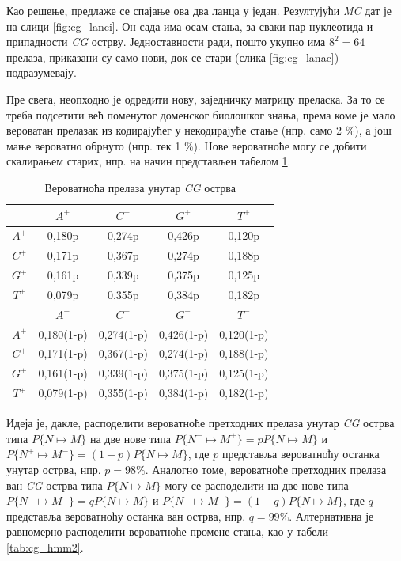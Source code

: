 \documentclass[12pt,oneside]{memoir}
\begin{document}
\begin{CJK}{UTF8}{ipxm}
Као решење, предлаже се спајање ова два ланца у један. Резултујући \textit{MC} дат је на слици \ref{fig:cg_lanci}. Он сада има осам стања, за сваки пар нуклеотида и припадности \textit{CG} острву. Једноставности ради, пошто укупно има $8^2 = 64$ прелаза, приказани су само нови, док се стари (слика \ref{fig:cg_lanac}) подразумевају.

Пре свега, неопходно је одредити нову, заједничку матрицу преласка. За то се треба подсетити већ поменутог доменског биолошког знања, према коме је мало вероватан прелазак из кодирајућег у некодирајуће стање (нпр. само 2 \%), а још мање вероватно обрнуто (нпр. тек 1 \%). Нове вероватноће могу се добити скалирањем старих, нпр. на начин представљен табелом \ref{tab:cg_hmm1}.

\begin{table}[h!]
  \centering
  \caption{Вероватноћа прелаза унутар \textit{CG} острва}
  \begin{tabular}{| c | c c c c |} \hline
   & $A^+$ & $C^+$ & $G^+$ & $T^+$ \\ \hline
  $A^+$ & 0,180p & 0,274p & 0,426p & 0,120p \\
  $C^+$ & 0,171p & 0,367p & 0,274p & 0,188p \\
  $G^+$ & 0,161p & 0,339p & 0,375p & 0,125p \\
  $T^+$ & 0,079p & 0,355p & 0,384p & 0,182p \\ \hhline{= | = = = =}
   & $A^-$ & $C^-$ & $G^-$ & $T^-$ \\ \hline
  $A^+$ & 0,180(1-p) & 0,274(1-p) & 0,426(1-p) & 0,120(1-p) \\
  $C^+$ & 0,171(1-p) & 0,367(1-p) & 0,274(1-p) & 0,188(1-p) \\
  $G^+$ & 0,161(1-p) & 0,339(1-p) & 0,375(1-p) & 0,125(1-p) \\
  $T^+$ & 0,079(1-p) & 0,355(1-p) & 0,384(1-p) & 0,182(1-p) \\ \hline
  \end{tabular}
  \label{tab:cg_hmm1}
\end{table}

Идеја је, дакле, расподелити вероватноће претходних прелаза унутар \textit{CG} острва типа $P\{N \mapsto M\}$ на две нове типа $P\{N^+ \mapsto M^+\} = p P\{N \mapsto M\}$ и $P\{N^+ \mapsto M^-\} = (1-p) P\{N \mapsto M\}$, где $p$ представља вероватноћу останка унутар острва, нпр. $p = 98 \%$. Аналогно томе, вероватноће претходних прелаза ван \textit{CG} острва типа $P\{N \mapsto M\}$ могу се расподелити на две нове типа $P\{N^- \mapsto M^-\} = q P\{N \mapsto M\}$ и $P\{N^- \mapsto M^+\} = (1-q) P\{N \mapsto M\}$, где $q$ представља вероватноћу останка ван острва, нпр. $q = 99 \%$. Алтернативна је равномерно расподелити вероватноће промене стања, као у табели \ref{tab:cg_hmm2}.


\end{CJK}
\end{document}
